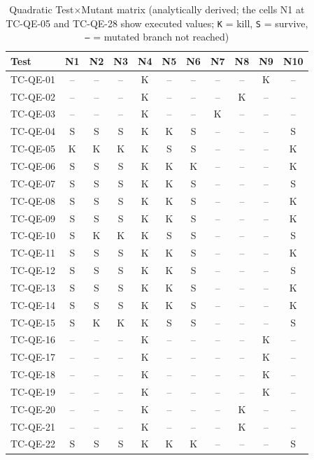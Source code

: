 \documentclass[11pt,a4paper]{article}
\begin{document}
\begin{table}[H]
\centering
\caption{Quadratic Test\(\times\)Mutant matrix (analytically derived; the cells N1 at TC-QE-05 and TC-QE-28 show executed values; \texttt{K} = kill, \texttt{S} = survive, \texttt{--} = mutated branch not reached)}
\label{tab:quad-matrix}
\scriptsize
\setlength{\tabcolsep}{4pt}
\begin{tabular}{lcccccccccc}
\toprule
Test & N1 & N2 & N3 & N4 & N5 & N6 & N7 & N8 & N9 & N10 \\
\midrule
TC-QE-01 & -- & -- & -- & K & -- & -- & -- & -- & K & -- \\
TC-QE-02 & -- & -- & -- & K & -- & -- & -- & K & -- & -- \\
TC-QE-03 & -- & -- & -- & K & -- & -- & K & -- & -- & -- \\
TC-QE-04 & S & S & S & K & K & S & -- & -- & -- & S \\
TC-QE-05 & K & K & K & K & S & S & -- & -- & -- & K \\
TC-QE-06 & S & S & S & K & K & K & -- & -- & -- & K \\
TC-QE-07 & S & S & S & K & K & S & -- & -- & -- & S \\
TC-QE-08 & S & S & S & K & K & S & -- & -- & -- & K \\
TC-QE-09 & S & S & S & K & K & S & -- & -- & -- & K \\
TC-QE-10 & S & K & K & K & S & S & -- & -- & -- & S \\
TC-QE-11 & S & S & S & K & K & S & -- & -- & -- & K \\
TC-QE-12 & S & S & S & K & K & S & -- & -- & -- & S \\
TC-QE-13 & S & S & S & K & K & S & -- & -- & -- & K \\
TC-QE-14 & S & S & S & K & K & S & -- & -- & -- & K \\
TC-QE-15 & S & K & K & K & S & S & -- & -- & -- & S \\
TC-QE-16 & -- & -- & -- & K & -- & -- & -- & -- & K & -- \\
TC-QE-17 & -- & -- & -- & K & -- & -- & -- & -- & K & -- \\
TC-QE-18 & -- & -- & -- & K & -- & -- & -- & -- & K & -- \\
TC-QE-19 & -- & -- & -- & K & -- & -- & -- & -- & K & -- \\
TC-QE-20 & -- & -- & -- & K & -- & -- & -- & K & -- & -- \\
TC-QE-21 & -- & -- & -- & K & -- & -- & -- & K & -- & -- \\
TC-QE-22 & S & S & S & K & K & K & -- & -- & -- & S \\

\end{tabular}
\end{table}
\end{document}
